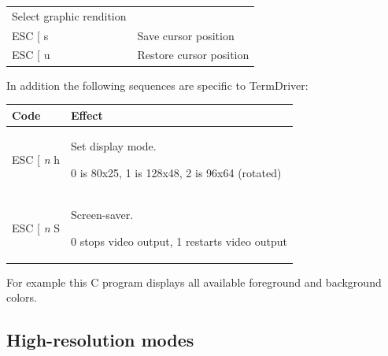 \documentclass{article}
\begin{document}
\begin{longtable}[]{@{}ll@{}}
\begin{minipage}[t]{0.60\columnwidth}
Select graphic rendition
\end{minipage}\tabularnewline
\begin{minipage}[t]{0.34\columnwidth}\raggedright
ESC {[} s
\end{minipage} & \begin{minipage}[t]{0.60\columnwidth}\raggedright
Save cursor position
\end{minipage}\tabularnewline
\begin{minipage}[t]{0.34\columnwidth}\raggedright
ESC {[} u
\end{minipage} & \begin{minipage}[t]{0.60\columnwidth}\raggedright
Restore cursor position
\end{minipage}\tabularnewline
\bottomrule
\end{longtable}

In addition the following sequences are specific to TermDriver:

\begin{longtable}[]{@{}ll@{}}
\toprule
\begin{minipage}[b]{0.34\columnwidth}\raggedright
Code
\end{minipage} & \begin{minipage}[b]{0.60\columnwidth}\raggedright
Effect
\end{minipage}\tabularnewline
\midrule
\endhead
\begin{minipage}[t]{0.34\columnwidth}\raggedright
ESC {[} \emph{n} h
\end{minipage} & \begin{minipage}[t]{0.60\columnwidth}\raggedright
Set display mode.

0 is 80x25, 1 is 128x48, 2 is 96x64 (rotated)
\end{minipage}\tabularnewline
\begin{minipage}[t]{0.34\columnwidth}\raggedright
ESC {[} \emph{n} S
\end{minipage} & \begin{minipage}[t]{0.60\columnwidth}\raggedright
Screen-saver.

0 stops video output, 1 restarts video output
\end{minipage}\tabularnewline
\bottomrule
\end{longtable}

\noindent
For example this C program displays all available foreground and background colors.


\subsection{High-resolution modes}
\end{document}
